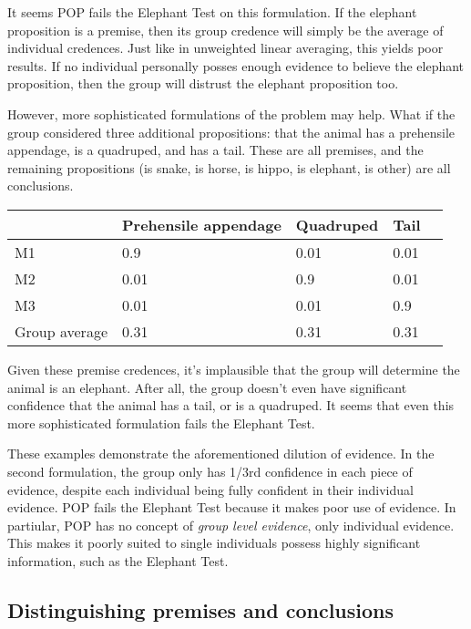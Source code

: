 \documentclass{article}
\begin{document}
\noindent
It seems POP fails the Elephant Test on this formulation. If the elephant proposition is a premise, then its group credence will simply be the average of individual credences. Just like in unweighted linear averaging, this yields poor results. If no individual personally posses enough evidence to believe the elephant proposition, then the group will distrust the elephant proposition too.

However, more sophisticated formulations of the problem may help. What if the group considered three additional propositions: that the animal has a prehensile appendage, is a quadruped, and has a tail. These are all premises, and the remaining propositions (is snake, is horse, is hippo, is elephant, is other) are all conclusions.

\begin{center}
\begin{tabular}{ | l | l | l | l | l | }
  \hline 
     & Prehensile appendage & Quadruped & Tail\\ \hline
  M1 & 0.9 & 0.01 & 0.01 \\ \hline
  M2 & 0.01 & 0.9 & 0.01 \\ \hline
  M3 & 0.01 & 0.01 & 0.9 \\ \hline
  Group average & 0.31 & 0.31 & 0.31 \\ \hline
\end{tabular}
\end{center}

\noindent
Given these premise credences, it's implausible that the group will determine the animal is an elephant. After all, the group doesn't even have significant confidence that the animal has a tail, or is a quadruped. It seems that even this more sophisticated formulation fails the Elephant Test. 

These examples demonstrate the aforementioned dilution of evidence. In the second formulation, the group only has 1/3rd confidence in each piece of evidence, despite each individual being fully confident in their individual evidence. POP fails the Elephant Test because it makes poor use of evidence. In partiular, POP has no concept of \textit{group level evidence}, only individual evidence. This makes it poorly suited to single individuals possess highly significant information, such as the Elephant Test.

\subsection{Distinguishing premises and conclusions}
\end{document}
